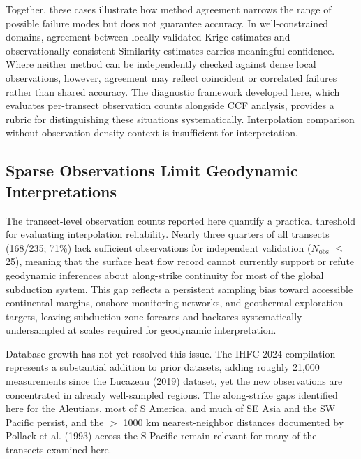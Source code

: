 \documentclass[draft,linenumbers]{agujournal2019}
\begin{document}
Together, these cases illustrate how method agreement narrows the range
of possible failure modes but does not guarantee accuracy. In
well-constrained domains, agreement between locally-validated Krige
estimates and observationally-consistent Similarity estimates carries
meaningful confidence. Where neither method can be independently checked
against dense local observations, however, agreement may reflect
coincident or correlated failures rather than shared accuracy. The
diagnostic framework developed here, which evaluates per-transect
observation counts alongside CCF analysis, provides a rubric for
distinguishing these situations systematically. Interpolation comparison
without observation-density context is insufficient for interpretation.

\subsection{Sparse Observations Limit Geodynamic
Interpretations}\label{sec:sparse-observations-limit-geodynamic-interpretations}

The transect-level observation counts reported here quantify a practical
threshold for evaluating interpolation reliability. Nearly three
quarters of all transects (168/235; 71\%) lack sufficient observations
for independent validation (\(N_\mathrm{obs}\) \(\leq\) 25), meaning
that the surface heat flow record cannot currently support or refute
geodynamic inferences about along-strike continuity for most of the
global subduction system. This gap reflects a persistent sampling bias
toward accessible continental margins, onshore monitoring networks, and
geothermal exploration targets, leaving subduction zone forearcs and
backarcs systematically undersampled at scales required for geodynamic
interpretation.

Database growth has not yet resolved this issue. The IHFC 2024
compilation represents a substantial addition to prior datasets, adding
roughly 21,000 measurements since the Lucazeau (2019) dataset, yet the
new observations are concentrated in already well-sampled regions. The
along-strike gaps identified here for the Aleutians, most of S America,
and much of SE Asia and the SW Pacific persist, and the \(>\) 1000 km
nearest-neighbor distances documented by Pollack et al. (1993) across
the S Pacific remain relevant for many of the transects examined here.
\end{document}
